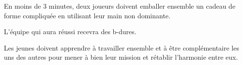 \documentclass{grand-jeu}
\begin{document}
\begin{liste-materiel}
\end{liste-materiel}

\begin{regles}
En moins de 3 minutes, deux joueurs doivent emballer ensemble un cadeau de forme compliquée en utilisant leur main non dominante. 

L’équipe qui aura réussi recevra des b-dures.
\end{regles}

\begin{imaginaire}
Les jeunes doivent apprendre à travailler ensemble et à être complémentaire les uns des autres pour mener à bien leur mission et rétablir l'harmonie entre eux. 
\end{imaginaire}

\begin{moments-stop}
\end{moments-stop}
\end{document}
